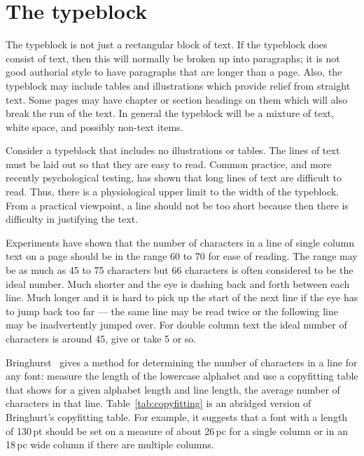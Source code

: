 \documentclass[10pt,a4paper,oneside,extrafontsizes]{memoir}%
\newcommand\U[2]{\textrm{#1}\,\textrm{#2}}
\begin{document}
\section{The typeblock} \label{sec:tblock}

\begin{paracol}{2}
\switchEng
    The typeblock is not just a rectangular block of text. If the typeblock
does consist of text, then this will normally be broken up into 
paragraphs; it is not good authorial style to have 
paragraphs that are longer than a page. Also, the typeblock may include 
tables and illustrations which provide 
relief from straight text. Some pages may have chapter or section 
headings on them which
will also break the run of the text. In general the typeblock will
be a mixture of text, white space, and possibly non-text items.

    Consider a typeblock that includes no illustrations 
or tables.
The lines of text must be laid out so that they are easy to read.
Common practice, and more recently psychological testing, has shown that
long lines of text are difficult to read. Thus, there is a physiological
upper limit to the width of the typeblock. From a practical viewpoint,
a line should not be too short because then there is difficulty in justifying
the text.

    Experiments have shown that the number of characters in a line of
single column text on a page should be
in the range 60 to 70 for ease of reading. The range may be as much
as 45 to 75 characters but 66 characters is often
considered to be the ideal number. Much shorter and the eye is dashing
back and forth between each line. Much longer and it is hard to pick up the
start of the next line if the eye has to jump back too far --- the same line
may be read twice or the following line may be inadvertently jumped over.
For double column text the ideal number of characters 
is around 45, give or take 5 or so.

    Bringhurst~\autocite{BRINGHURST99} gives a 
method for determining the number
of characters in a line for any font: 
measure the length of the lowercase alphabet and use a 
copyfitting 
table that shows for a given alphabet 
length and line length, the average number of characters in that line.
 Table~\ref{tab:copyfitting} is an
abridged version of Bringhurt's copyfitting table.
For example, it suggests that a font with a length of \U{130}{pt} should be
set on a measure of about \U{26}{pc} for a single column 
or in an \U{18}{pc} wide column if there are multiple 
columns.
\end{paracol} 
\end{document}
